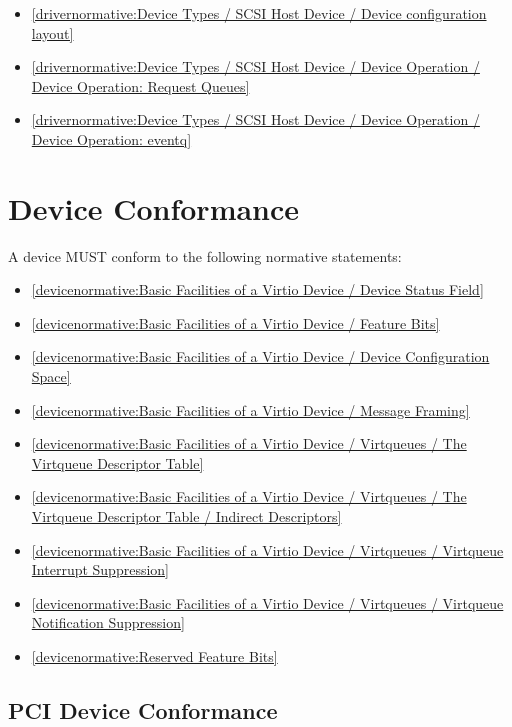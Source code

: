 \begin{itemize}
\item \ref{drivernormative:Device Types / SCSI Host Device / Device configuration layout}
\item \ref{drivernormative:Device Types / SCSI Host Device / Device Operation / Device Operation: Request Queues}
\item \ref{drivernormative:Device Types / SCSI Host Device / Device Operation / Device Operation: eventq}
\end{itemize}

\section{Device Conformance}\label{sec:Conformance / Device Conformance}

A device MUST conform to the following normative statements:

\begin{itemize}
\item \ref{devicenormative:Basic Facilities of a Virtio Device / Device Status Field}
\item \ref{devicenormative:Basic Facilities of a Virtio Device / Feature Bits}
\item \ref{devicenormative:Basic Facilities of a Virtio Device / Device Configuration Space}
\item \ref{devicenormative:Basic Facilities of a Virtio Device / Message Framing}
\item \ref{devicenormative:Basic Facilities of a Virtio Device / Virtqueues / The Virtqueue Descriptor Table}
\item \ref{devicenormative:Basic Facilities of a Virtio Device / Virtqueues / The Virtqueue Descriptor Table / Indirect Descriptors}
\item \ref{devicenormative:Basic Facilities of a Virtio Device / Virtqueues / Virtqueue Interrupt Suppression}
\item \ref{devicenormative:Basic Facilities of a Virtio Device / Virtqueues / Virtqueue Notification Suppression}
\item \ref{devicenormative:Reserved Feature Bits}
\end{itemize}

\subsection{PCI Device Conformance}\label{sec:Conformance / Device Conformance / PCI Device Conformance}

